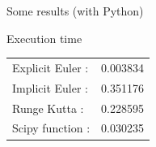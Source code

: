 \documentclass[10pt,xcolor={table,dvipsnames},t]{beamer}
\begin{document}
\begin{frame}[allowframebreaks]{Some results (with Python)}
	\newpage
	
	\begin{block}{Execution time}
		\; \\
		\begin{center}
			\begin{tabular}{ll}
				Explicit Euler :&  0.003834 \\
				Implicit Euler :&  0.351176 \\
				Runge Kutta :& 0.228595 \\
				Scipy function :&  0.030235
			\end{tabular}
		\end{center}
	\end{block}
    
\end{frame}
\end{document}
